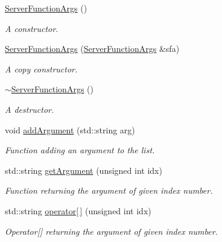 \begin{DoxyCompactItemize}
\item 
\hypertarget{class_net_socket_p_p_1_1_server_function_args_a12a15c962ca5f38701e8d3f461623668}{\hyperlink{class_net_socket_p_p_1_1_server_function_args_a12a15c962ca5f38701e8d3f461623668}{Server\-Function\-Args} ()}\label{class_net_socket_p_p_1_1_server_function_args_a12a15c962ca5f38701e8d3f461623668}

\begin{DoxyCompactList}\small\item\em A constructor. \end{DoxyCompactList}\item 
\hyperlink{class_net_socket_p_p_1_1_server_function_args_ac7f9a434d7525e09f9568a3b7fb33d51}{Server\-Function\-Args} (\hyperlink{class_net_socket_p_p_1_1_server_function_args}{Server\-Function\-Args} \&sfa)
\begin{DoxyCompactList}\small\item\em A copy constructor. \end{DoxyCompactList}\item 
\hypertarget{class_net_socket_p_p_1_1_server_function_args_a94b84df8925528f994cff8d5f95b56b3}{\hyperlink{class_net_socket_p_p_1_1_server_function_args_a94b84df8925528f994cff8d5f95b56b3}{$\sim$\-Server\-Function\-Args} ()}\label{class_net_socket_p_p_1_1_server_function_args_a94b84df8925528f994cff8d5f95b56b3}

\begin{DoxyCompactList}\small\item\em A destructor. \end{DoxyCompactList}\item 
void \hyperlink{class_net_socket_p_p_1_1_server_function_args_a59fd11d1cef4e1be812da1e2d3399327}{add\-Argument} (std\-::string arg)
\begin{DoxyCompactList}\small\item\em Function adding an argument to the list. \end{DoxyCompactList}\item 
std\-::string \hyperlink{class_net_socket_p_p_1_1_server_function_args_aaf399ccff87f5692d31f7edeb8469e0e}{get\-Argument} (unsigned int idx)
\begin{DoxyCompactList}\small\item\em Function returning the argument of given index number. \end{DoxyCompactList}\item 
std\-::string \hyperlink{class_net_socket_p_p_1_1_server_function_args_a905fd5c411969f8976541a10c243fc40}{operator\mbox{[}$\,$\mbox{]}} (unsigned int idx)
\begin{DoxyCompactList}\small\item\em Operator\mbox{[}\mbox{]} returning the argument of given index number. \end{DoxyCompactList}\end{DoxyCompactItemize}


